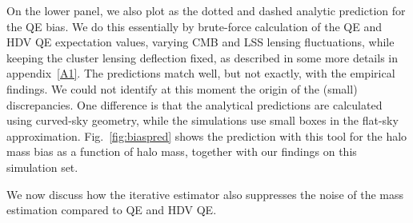 \documentclass[prd, superscriptaddress, tightenlines, longbibliography, nofootinbib, eqsecnum, amsfonts, amsmath, floatfix, twocolumn, notitlepage]{revtex4-2}
\begin{document}
On the lower panel, we also plot as the dotted and dashed analytic prediction for the QE bias. 
We do this essentially by brute-force calculation of the QE and HDV QE expectation values, varying CMB and LSS lensing fluctuations, while keeping the cluster lensing deflection fixed, as described in some more details in appendix~\ref{A1}.
The predictions match well, but not exactly, with the empirical findings. 
We could not identify at this moment the origin of the (small) discrepancies. 
One difference is that the analytical predictions are calculated using curved-sky geometry, while the simulations use small boxes in the flat-sky approximation. Fig.~\ref{fig:biaspred} shows the prediction with this tool for the halo mass bias as a function of halo mass, together with our findings on this simulation set.

We now discuss how the iterative estimator also suppresses the noise of the mass estimation compared to QE and HDV QE.
\end{document}
